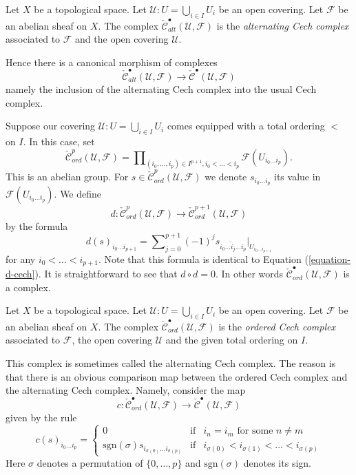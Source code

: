\begin{definition}
\label{definition-alternating-cech-complex}
Let $X$ be a topological space. Let $\mathcal{U} : U = \bigcup_{i \in I} U_i$
be an open covering. Let $\mathcal{F}$ be an abelian sheaf on $X$.
The complex $\check{\mathcal{C}}_{alt}^\bullet(\mathcal{U}, \mathcal{F})$
is the {\it alternating Cech complex} associated to $\mathcal{F}$ and the
open covering $\mathcal{U}$.
\end{definition}

\noindent
Hence there is a canonical morphism of complexes
$$
\check{\mathcal{C}}_{alt}^\bullet(\mathcal{U}, \mathcal{F})
\longrightarrow
\check{\mathcal{C}}^\bullet(\mathcal{U}, \mathcal{F})
$$
namely the inclusion of the alternating Cech complex into the
usual Cech complex.

\medskip\noindent
Suppose our covering $\mathcal{U} : U = \bigcup_{i \in I} U_i$ comes
equipped with a total ordering $<$ on $I$. In this case, set
$$
\check{\mathcal{C}}_{ord}^p(\mathcal{U}, \mathcal{F})
=
\prod\nolimits_{(i_0, \ldots, i_p) \in I^{p + 1}, i_0 < \ldots < i_p}
\mathcal{F}(U_{i_0\ldots i_p}).
$$
This is an abelian group. For
$s \in \check{\mathcal{C}}_{ord}^p(\mathcal{U}, \mathcal{F})$ we denote
$s_{i_0\ldots i_p}$ its value in $\mathcal{F}(U_{i_0\ldots i_p})$.
We define
$$
d : \check{\mathcal{C}}_{ord}^p(\mathcal{U}, \mathcal{F})
\longrightarrow
\check{\mathcal{C}}_{ord}^{p + 1}(\mathcal{U}, \mathcal{F})
$$
by the formula
$$
d(s)_{i_0\ldots i_{p + 1}}
=
\sum\nolimits_{j = 0}^{p + 1}
(-1)^j
s_{i_0\ldots \hat i_j \ldots i_p}|_{U_{i_0\ldots i_{p + 1}}}
$$
for any $i_0 < \ldots < i_{p + 1}$. Note that this formula is identical
to Equation (\ref{equation-d-cech}).
It is straightforward to see that $d \circ d = 0$. In other words
$\check{\mathcal{C}}_{ord}^\bullet(\mathcal{U}, \mathcal{F})$ is a complex.

\begin{definition}
\label{definition-ordered-cech-complex}
Let $X$ be a topological space.
Let $\mathcal{U} : U = \bigcup_{i \in I} U_i$ be an open covering.
Let $\mathcal{F}$ be an abelian sheaf on $X$.
The complex $\check{\mathcal{C}}_{ord}^\bullet(\mathcal{U}, \mathcal{F})$
is the {\it ordered Cech complex} associated to $\mathcal{F}$, the
open covering $\mathcal{U}$ and the given total ordering on $I$.
\end{definition}

\noindent
This complex is sometimes called the alternating Cech complex.
The reason is that there is an obvious comparison map between
the ordered Cech complex and the alternating Cech complex.
Namely, consider the map
$$
c :
\check{\mathcal{C}}_{ord}^\bullet(\mathcal{U}, \mathcal{F})
\longrightarrow
\check{\mathcal{C}}^\bullet(\mathcal{U}, \mathcal{F})
$$
given by the rule
$$
c(s)_{i_0\ldots i_p} = 
\left\{
\begin{matrix}
0 &
\text{if} &
i_n = i_m \text{ for some } n \not = m\\
\text{sgn}(\sigma) s_{i_{\sigma(0)}\ldots i_{\sigma(p)}} &
\text{if} &
i_{\sigma(0)} < i_{\sigma(1)} < \ldots < i_{\sigma(p)}
\end{matrix}
\right.
$$
Here $\sigma$ denotes a permutation of $\{0, \ldots, p\}$ and
$\text{sgn}(\sigma)$ denotes its sign.

